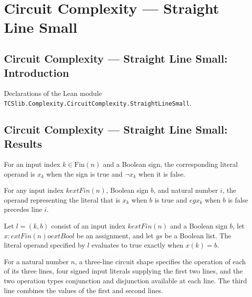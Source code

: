 \section{Circuit Complexity --- Straight Line Small}
\subsection*{Circuit Complexity --- Straight Line Small: Introduction}

Declarations of the Lean module \texttt{TCSlib.Complexity.CircuitComplexity.StraightLineSmall}.

\subsection*{Circuit Complexity --- Straight Line Small: Results}

\begin{definition}
\label{BoolCircuit.SLOperand.lit}
\leanok
{}
For an input index $k\in\mathrm{Fin}(n)$ and a Boolean sign, the corresponding literal
operand is $x_k$ when the sign is true and $\neg x_k$ when it is false.
\end{definition}

\begin{theorem}
\label{BoolCircuit.SLOperand.lit_before}
\leanok
{}
For any input index $k	ext{ Fin}(n)$, Boolean sign $b$, and natural number $i$, the
operand representing the literal that is $x_k$ when $b$ is true and $
eg x_k$ when $b$ is false precedes line $i$.
\end{theorem}

\begin{theorem}
\label{BoolCircuit.SLOperand.lit_eval}
\leanok
{}
Let $l=(k,b)$ consist of an input index $k	ext{ Fin}(n)$ and a Boolean sign $b$, let
$x:	ext{Fin}(n)	o	ext{Bool}$ be an assignment, and let $ys$ be a Boolean list. The
literal operand specified by $l$ evaluates to true exactly when $x(k)=b$.
\end{theorem}

\begin{definition}
\label{BoolCircuit.Shape3}
\leanok
{}
For a natural number $n$, a three-line circuit shape specifies the operation of each of
its three lines, four signed input literals supplying the first two lines, and the two
operation types conjunction and disjunction available at each line. The third line
combines the values of the first and second lines.
\end{definition}

